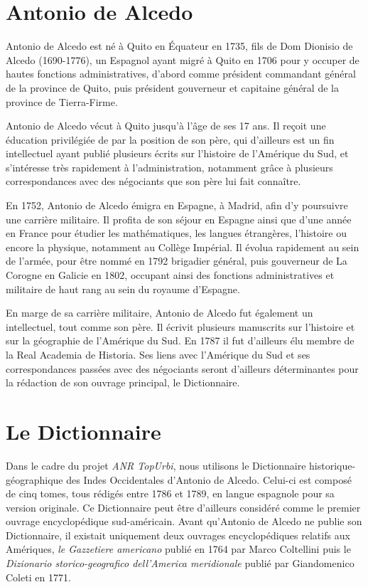 \documentclass[a4paper,12pt,twoside]{book}
\begin{document}
	\section{Antonio de Alcedo}
	
Antonio de Alcedo est né à Quito en Équateur en 1735, fils de Dom Dionisio de Alcedo (1690-1776), un Espagnol ayant migré à Quito en 1706 pour y occuper de hautes fonctions administratives, d’abord comme président commandant général de la province de Quito, puis président gouverneur et capitaine général de la province de Tierra-Firme.

Antonio de Alcedo vécut à Quito jusqu’à l’âge de ses 17 ans. Il reçoit une éducation privilégiée de par la position de son père, qui d’ailleurs est un fin intellectuel ayant publié plusieurs écrits sur l’histoire de l’Amérique du Sud, et s’intéresse très rapidement à l’administration, notamment grâce à plusieurs correspondances avec des négociants que son père lui fait connaître.  

En 1752, Antonio de Alcedo émigra en Espagne, à Madrid, afin d’y poursuivre une carrière militaire. Il profita de son séjour en Espagne ainsi que d’une année en France pour étudier les mathématiques, les langues étrangères, l’histoire ou encore la physique, notamment au Collège Impérial. Il évolua rapidement au sein de l’armée, pour être nommé en 1792 brigadier général, puis gouverneur de La Corogne en Galicie en 1802, occupant ainsi des fonctions administratives et militaire de haut rang au sein du royaume d’Espagne.  

En marge de sa carrière militaire, Antonio de Alcedo fut également un intellectuel, tout comme son père. Il écrivit plusieurs manuscrits sur l’histoire et sur la géographie de l’Amérique du Sud. En 1787 il fut d’ailleurs élu membre de la Real Academia de Historia. Ses liens avec l’Amérique du Sud et ses correspondances passées avec des négociants seront d’ailleurs déterminantes pour la rédaction de son ouvrage principal, le Dictionnaire. 
	
	\section{Le Dictionnaire}
	
Dans le cadre du projet \textit{ANR TopUrbi}, nous utilisons le Dictionnaire historique-géographique des Indes Occidentales d’Antonio de Alcedo. Celui-ci est composé de cinq tomes, tous rédigés entre 1786 et 1789, en langue espagnole pour sa version originale. Ce Dictionnaire peut être d’ailleurs considéré comme le premier ouvrage encyclopédique sud-américain. Avant qu’Antonio de Alcedo ne publie son Dictionnaire, il existait uniquement deux ouvrages encyclopédiques relatifs aux Amériques, \textit{le Gazzetiere americano} publié en 1764 par Marco Coltellini puis le \textit{Dizionario storico-geografico dell’America meridionale} publié par Giandomenico Coleti en 1771.
\end{document}
